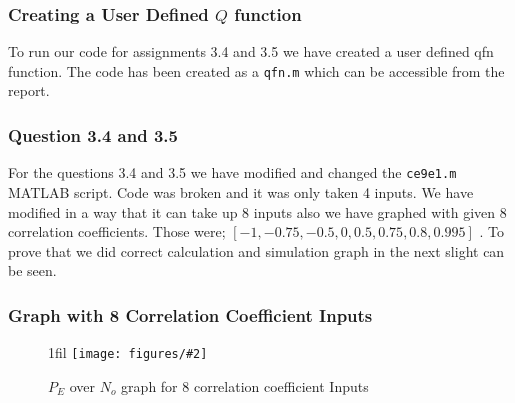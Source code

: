 \documentclass{beamer}
\makeatletter
\newcommand{\code}[1]{\texttt{#1}}
\newcommand*{\centerfloat}{%
  \parindent \z@
  \leftskip \z@ \@plus 1fil \@minus \textwidth
  \rightskip\leftskip
  \parfillskip \z@skip}
\newcommand{\fig}[3]{
  \begin{figure}[H]
  \centerfloat
    \texttt{[image: figures/\#2]}
    \caption{#3}
  \end{figure}
}
\makeatother
\begin{document}
\begin{frame}
	\frametitle{Creating a User Defined $Q$ function}
To run our code for assignments 3.4 and 3.5 we have created a user defined  qfn function. The code has been created as a \code{qfn.m} which can be accessible from the report.
\end{frame}

\begin{frame}
	\frametitle{Question 3.4 and 3.5}
For the questions 3.4  and 3.5 we have modified and changed the \code{ce9e1.m} MATLAB script. Code was broken and it was only taken 4 inputs. We have modified in a way that it can take up 8 inputs also we have graphed with given 8 correlation coefficients. Those were;
$[-1, -0.75, -0.5, 0, 0.5, 0.75, 0.8 ,0.995]$ . To prove that we did correct calculation and simulation graph in the next slight can be seen.
\end{frame}

\begin{frame}
	\frametitle{Graph with 8 Correlation Coefficient Inputs}
	\fig{5cm}{question351.png}{$P_E $ over $N_o$ graph for 8 correlation coefficient Inputs}
\end{frame}
\end{document}
